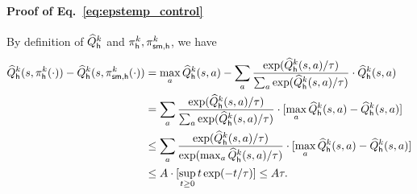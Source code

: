  \paragraph{Proof of Eq.~\eqref{eq:epstemp_control}}
 By definition of ${\widehat{{Q}}}_{\mathsf{h}}^k$ and ${\pi}_{\mathsf{h}}^k,{\pi}^k_{{\mathsf{sm}},{\mathsf{h}}}$, we have
 \begin{align*}
     {\widehat{{Q}}}^k_{\mathsf{h}}({s},{\pi}^k_{{\mathsf{h}}}(\cdot))-{\widehat{{Q}}}^k_{\mathsf{h}}({s},{\pi}^k_{{\mathsf{sm}},{\mathsf{h}}}(\cdot)) &=\max_{{a}} {\widehat{{Q}}}^k_{\mathsf{h}}({s},{a})-
\sum_{{a}}\frac{\exp({\widehat{{Q}}}^k_{\mathsf{h}}({s},{a})/{\tau})}{\sum_{a} \exp({\widehat{{Q}}}^k_{\mathsf{h}}({s},{a})/{\tau})}\cdot{\widehat{{Q}}}^k_{\mathsf{h}}({s},{a})\\
&=
\sum_{{a}}\frac{\exp({\widehat{{Q}}}^k_{\mathsf{h}}({s},{a})/{\tau})}{\sum_{a} \exp({\widehat{{Q}}}^k_{\mathsf{h}}({s},{a})/{\tau})}\cdot[\max_{{a}} {\widehat{{Q}}}^k_{\mathsf{h}}({s},{a})-{\widehat{{Q}}}^k_{\mathsf{h}}({s},{a})]\\
&\leq
\sum_{{a}}\frac{\exp({\widehat{{Q}}}^k_{\mathsf{h}}({s},{a})/{\tau})}{ \exp(\max_{a}{\widehat{{Q}}}^k_{\mathsf{h}}({s},{a})/{\tau})}\cdot[\max_{{a}} {\widehat{{Q}}}^k_{\mathsf{h}}({s},{a})-{\widehat{{Q}}}^k_{\mathsf{h}}({s},{a})]\\
&\leq {A} \cdot [\sup_{t\geq 0}t\exp(-t/{\tau})]\leq{A}{\tau}.
 \end{align*}
